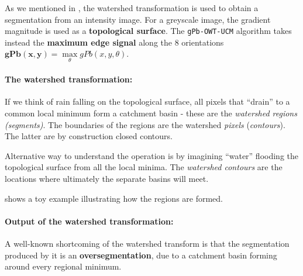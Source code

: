 As we mentioned in , the watershed transformation is used to obtain a segmentation from an intensity image. 
For a greyscale image, the gradient magnitude is used as a {\bf topological surface}. The {\tt gPb-OWT-UCM} algorithm takes instead the {\bf maximum edge signal} along the 8 orientations $\mathbf{gPb(x,y)}=\max\limits_{\theta}gPb(x,y,\theta)$. 

\paragraph{The watershed transformation:} If we think of rain falling on the %
topological surface, all pixels that ``drain'' to a common local minimum form a catchment basin - these are the {\it watershed regions (segments)}. The boundaries of the regions are the watershed \textit{pixels} (\textit{contours}). 
The latter are by construction closed contours. 

Alternative way to understand the operation is by imagining ``water'' flooding the topological surface from all the local minima. The {\it watershed contours} are the locations where ultimately the separate basins will meet.

 shows a toy example illustrating how the regions are formed.

\paragraph{Output of the watershed transformation:} A well-known shortcoming of the watershed transform is that the 
segmentation produced by it is an {\bf oversegmentation}, due to a catchment basin forming around every regional minimum.



